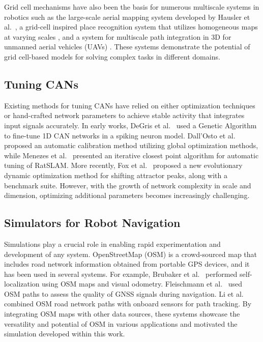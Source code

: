 Grid cell mechanisms have also been the basis for numerous multiscale systems in robotics such as the large-scale aerial mapping system developed by Hausler et al.~\cite{hausler2020bio}, a grid-cell inspired place recognition system that utilizes homogeneous maps at varying scales \cite{chen2015bio}, and a system for multiscale path integration in 3D for unmanned aerial vehicles (UAVs) \cite{yang2021path}. These systems demonstrate the potential of grid cell-based models for solving complex tasks in different domains. 


%
%


%
%
\subsection{Tuning CANs}
\label{subsec:tuningcans}
Existing methods for tuning CANs have relied on either optimization techniques or hand-crafted network parameters to achieve stable activity that integrates input signals accurately. In early works, DeGris et al.~\cite{degris2004spiking} used a Genetic Algorithm to fine-tune 1D CAN networks in a spiking neuron model. Dall'Osto et al.~\cite{dall2018automatic} proposed an automatic calibration method utilizing global optimization methods, while Menezes et al.~\cite{menezes2020automatic} presented an iterative closest point algorithm for automatic tuning of RatSLAM. More recently, Fox et al.~\cite{fox2022new} proposed a new evolutionary dynamic optimization method for shifting attractor peaks, along with a benchmark suite. However, with the growth of network complexity in scale and dimension, optimizing additional parameters becomes increasingly challenging.

%
%
\subsection{Simulators for Robot Navigation}
\label{subsec:simsfornavigation}
Simulations play a crucial role in enabling rapid experimentation and development of any system. OpenStreetMap (OSM) is a crowd-sourced map that includes road network information obtained from portable GPS devices, and it has been used in several systems. For example, Brubaker et al.~\cite{brubaker2013lost} performed self-localization using OSM maps and visual odometry. Fleischmann et al.~\cite{fleischmann2017using} used OSM paths to assess the quality of GNSS signals during navigation. Li et al.~\cite{li2021openstreetmap} combined OSM road network paths with onboard sensors for path tracking. By integrating OSM maps with other data sources, these systems showcase the versatility and potential of OSM in various applications and motivated the simulation developed within this work.

%
%



